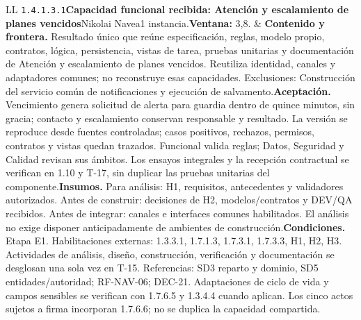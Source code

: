 \begin{longtable}{L{\tabcolsep\relax}L{\tabcolsep\relax}}
\texttt{1.\allowbreak{}4.\allowbreak{}1.\allowbreak{}3.\allowbreak{}1}\newline{}\textbf{Capacidad funcional recibida: Atención y escalamiento de planes vencidos}\newline{}Nikolai Navea\newline{}1 instancia.\newline{}\textbf{Ventana:} 3,8. & \textbf{Contenido y frontera.} Resultado único que reúne especificación, reglas, modelo propio, contratos, lógica, persistencia, vistas de tarea, pruebas unitarias y documentación de Atención y escalamiento de planes vencidos. Reutiliza identidad, canales y adaptadores comunes; no reconstruye esas capacidades. Exclusiones: Construcción del servicio común de notificaciones y ejecución de salvamento.\newline{}\textbf{Aceptación.} Vencimiento genera solicitud de alerta para guardia dentro de quince minutos, sin gracia; contacto y escalamiento conservan responsable y resultado. La versión se reproduce desde fuentes controladas; casos positivos, rechazos, permisos, contratos y vistas quedan trazados. Funcional valida reglas; Datos, Seguridad y Calidad revisan sus ámbitos. Los ensayos integrales y la recepción contractual se verifican en 1.10 y T-17, sin duplicar las pruebas unitarias del componente.\newline{}\textbf{Insumos.} Para análisis: H1, requisitos, antecedentes y validadores autorizados. Antes de construir: decisiones de H2, modelos/contratos y DEV/QA recibidos. Antes de integrar: canales e interfaces comunes habilitados. El análisis no exige disponer anticipadamente de ambientes de construcción.\newline{}\textbf{Condiciones.} Etapa E1. Habilitaciones externas: 1.3.3.1, 1.7.1.3, 1.7.3.1, 1.7.3.3, H1, H2, H3. Actividades de análisis, diseño, construcción, verificación y documentación se desglosan una sola vez en T-15. Referencias: SD3 reparto y dominio, SD5 entidades/autoridad; RF-NAV-06; DEC-21. Adaptaciones de ciclo de vida y campos sensibles se verifican con 1.7.6.5 y 1.3.4.4 cuando aplican. Los cinco actos sujetos a firma incorporan 1.7.6.6; no se duplica la capacidad compartida.\\\hline

\end{longtable}
